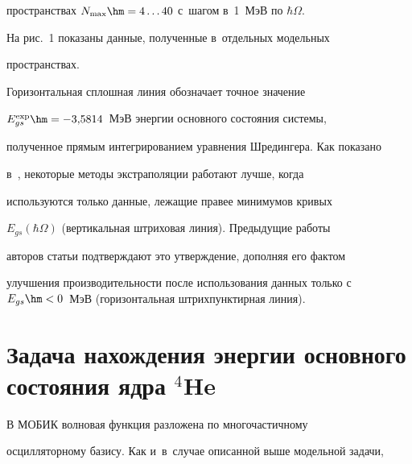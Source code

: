 пространствах $N_{\max}\hm= 4\ldots40$ с~шагом в~1~МэВ по $\hbar \Omega$. 


На рис.~1 показаны данные, полученные в~отдельных модельных 


пространствах.


  


 


  


  


  Горизонтальная сплош\-ная линия обозначает точ\-ное значение 


$E_{gs}^{\mathrm{exp}}\hm= -3{,}5814$~МэВ энергии основного со\-сто\-яния сис\-те\-мы, 


полученное прямым интегрированием уравнения Шредингера. Как показано 


в~\cite{14-b}, некоторые методы экстраполяции работают лучше, когда 


используются только данные, лежащие правее минимумов кривых 


$E_{gs}(\hbar\Omega)$ (вертикальная штриховая линия). Предыду\-щие работы 


авторов статьи под\-тверж\-да\-ют это утверж\-де\-ние, дополняя его фактом 


улучшения про\-из\-во\-ди\-тель\-ности после использования данных только с~$E_{gs} 


\hm < 0$~МэВ (горизонтальная штрихпунктирная линия).





\vspace*{-2pt}





\section{Задача нахождения энергии основного состояния ядра ${}^4$He}





\vspace*{-2pt}








  В МОБИК волновая функция разложена по мно\-го\-час\-тич\-но\-му 


осцилляторному базису. Как и~в~случае описанной выше модельной задачи, 


